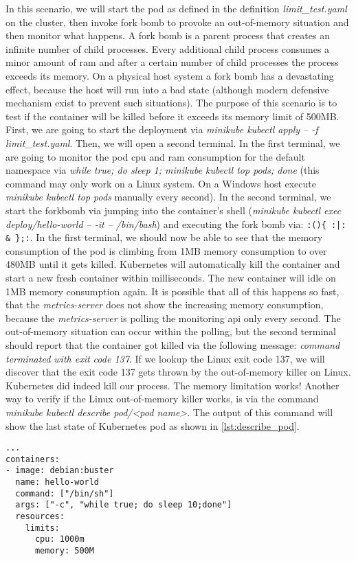 \documentclass[titlepage]{report}
\begin{document}
In this scenario, we will start the pod as defined in the definition \emph{limit\_test.yaml} on the cluster, then invoke fork bomb to provoke an out-of-memory situation and then monitor what happens.
A fork bomb is a parent process that creates an infinite number of child processes. Every additional child process consumes a minor amount of \gls{ram} and after a certain number of child processes
the process exceeds its memory. On a physical host system a fork bomb has a devastating effect, because the host will run into a bad state (although modern defensive mechanism exist to prevent such situations).
The purpose of this scenario is to test if the container will be killed before it exceeds its memory limit of 500MB. First, we are going to start the deployment via \emph{minikube kubectl apply -- -f limit\_test.yaml}.
Then, we will open a second terminal. In the first terminal, we are going to monitor the pod \gls{cpu} and \gls{ram} consumption for the default namespace via \emph{while true; do sleep 1; minikube kubectl top pods; done} 
(this command may only work on a Linux system. On a Windows host execute \emph{minikube kubectl top pods} manually every second).
In the second terminal, we start the forkbomb via jumping into the container's shell (\emph{minikube kubectl exec deploy/hello-world -- -it -- /bin/bash}) and executing the fork bomb via: \verb!:(){ :|: & };:!.
In the first terminal, we should now be able to see that the memory consumption of the pod is climbing from 1MB memory consumption to over 480MB until it gets killed. Kubernetes will automatically kill the container
and start a new fresh container within milliseconds. The new container will idle on 1MB memory consumption again. It is possible that all of this happens so fast, that the \emph{metrics-server} does not show the increasing
memory consumption, because the \emph{metrics-server} is polling the monitoring \gls{api} only every second. The out-of-memory situation can occur within the polling, but the second terminal should report that the container
got killed via the following message: \emph{command terminated with exit code 137}. If we lookup the Linux exit code 137, we will discover that the exit code 137 gets thrown by the out-of-memory killer on Linux. Kubernetes
did indeed kill our process. The memory limitation works! Another way to verify if the Linux out-of-memory killer works, is via the command \emph{minikube kubectl describe pod/<pod name>}. The output of this command
will show the last state of Kubernetes pod as shown in \autoref{lst:describe_pod}.
\begin{minipage}{\linewidth}
\begin{lstlisting}[caption={Snippet of our limit\_test.yaml file with a Debian Linux container running a sleep command in a while loop and an active limit of 1 CPU and 500MB memory)},label={lst:memory_test}]
...
containers:
- image: debian:buster
  name: hello-world
  command: ["/bin/sh"]
  args: ["-c", "while true; do sleep 10;done"]
  resources:
    limits:
      cpu: 1000m
      memory: 500M
\end{lstlisting}
\end{minipage}
\end{document}
